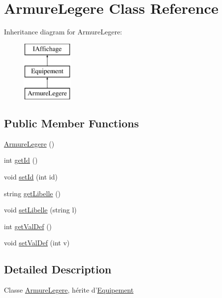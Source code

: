 \hypertarget{class_armure_legere}{\section{\-Armure\-Legere \-Class \-Reference}
\label{class_armure_legere}
}
\-Inheritance diagram for \-Armure\-Legere\-:\begin{figure}[H]
\begin{center}
\leavevmode
\includegraphics[height=3.000000cm]{class_armure_legere}
\end{center}
\end{figure}
\subsection*{\-Public \-Member \-Functions}
\begin{DoxyCompactItemize}
\item 
\hyperlink{class_armure_legere_ae074d68f3f168efb5f2bc479b848b89b}{\-Armure\-Legere} ()
\item 
int \hyperlink{class_armure_legere_a605de63de0fbb64f4170865ca8e7e851}{get\-Id} ()
\item 
void \hyperlink{class_armure_legere_a407cda69c45c312f8fa8df854504f717}{set\-Id} (int id)
\item 
string \hyperlink{class_armure_legere_a6201feeb0e1c65d756a2dc064a72b1c4}{get\-Libelle} ()
\item 
void \hyperlink{class_armure_legere_a403f2f2ad2300e361f50d29b5df7fda8}{set\-Libelle} (string l)
\item 
int \hyperlink{class_armure_legere_aa455d08100ac7895b1d1d7b61c92da3f}{get\-Val\-Def} ()
\item 
void \hyperlink{class_armure_legere_a827399af549f7fd182c9ff96be61a4d0}{set\-Val\-Def} (int v)
\end{DoxyCompactItemize}


\subsection{\-Detailed \-Description}
\-Classe \hyperlink{class_armure_legere}{\-Armure\-Legere}, hérite d'\hyperlink{class_equipement}{\-Equipement} 

